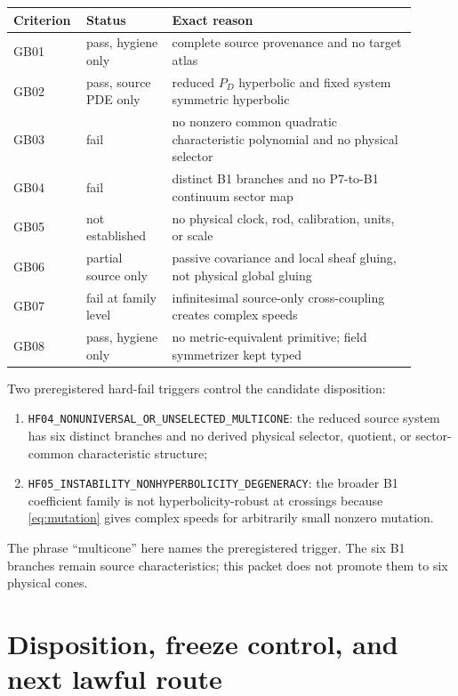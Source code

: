 \documentclass[11pt]{article}
\begin{document}
\begin{longtable}{>{\raggedright\arraybackslash}p{0.12\linewidth}
                  >{\raggedright\arraybackslash}p{0.20\linewidth}
                  >{\raggedright\arraybackslash}p{0.58\linewidth}}
\toprule
Criterion & Status & Exact reason\\
\midrule
GB01 & pass, hygiene only & complete source provenance and no target atlas\\
GB02 & pass, source PDE only & reduced $P_D$ hyperbolic and fixed system symmetric hyperbolic\\
GB03 & fail & no nonzero common quadratic characteristic polynomial and no physical selector\\
GB04 & fail & distinct B1 branches and no P7-to-B1 continuum sector map\\
GB05 & not established & no physical clock, rod, calibration, units, or scale\\
GB06 & partial source only & passive covariance and local sheaf gluing, not physical global gluing\\
GB07 & fail at family level & infinitesimal source-only cross-coupling creates complex speeds\\
GB08 & pass, hygiene only & no metric-equivalent primitive; field symmetrizer kept typed\\
\bottomrule
\end{longtable}

Two preregistered hard-fail triggers control the candidate disposition:
\begin{enumerate}[leftmargin=*]
  \item \texttt{HF04\_NONUNIVERSAL\_OR\_UNSELECTED\_MULTICONE}: the reduced
        source system has six distinct branches and no derived physical
        selector, quotient, or sector-common characteristic structure;
  \item \texttt{HF05\_INSTABILITY\_NONHYPERBOLICITY\_DEGENERACY}: the broader
        B1 coefficient family is not hyperbolicity-robust at crossings because
        \eqref{eq:mutation} gives complex speeds for arbitrarily small
        nonzero mutation.
\end{enumerate}
The phrase ``multicone'' here names the preregistered trigger.  The six B1
branches remain source characteristics; this packet does not promote them to
six physical cones.

\section{Disposition, freeze control, and next lawful route}
\end{document}
